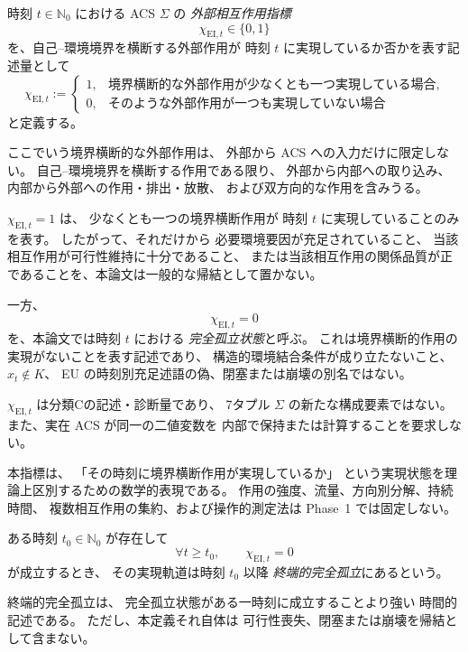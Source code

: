 \begin{definition}
\label{def:phi}
時刻 $t\in\mathbb{N}_0$ における ACS $\Sigma$ の
\emph{外部相互作用指標}
\[
  \chi_{\mathrm{EI},t}\in\{0,1\}
\]
を、自己--環境境界を横断する外部作用が
時刻 $t$ に実現しているか否かを表す記述量として
\[
  \chi_{\mathrm{EI},t}
  :=
  \begin{cases}
    1,
    &
    \text{境界横断的な外部作用が少なくとも一つ実現している場合},
    \\[4pt]
    0,
    &
    \text{そのような外部作用が一つも実現していない場合}
  \end{cases}
\]
と定義する。

ここでいう境界横断的な外部作用は、
外部から ACS への入力だけに限定しない。
自己--環境境界を横断する作用である限り、
外部から内部への取り込み、
内部から外部への作用・排出・放散、
および双方向的な作用を含みうる。

$\chi_{\mathrm{EI},t}=1$ は、
少なくとも一つの境界横断作用が
時刻 $t$ に実現していることのみを表す。
したがって、それだけから
必要環境要因が充足されていること、
当該相互作用が可行性維持に十分であること、
または当該相互作用の関係品質が正であることを、本論文は一般的な帰結として置かない。

一方、
\[
  \chi_{\mathrm{EI},t}=0
\]
を、本論文では時刻 $t$ における
\emph{完全孤立状態}と呼ぶ。
これは境界横断的作用の実現がないことを表す記述であり、
構造的環境結合条件が成り立たないこと、$x_t\notin K$、
EU の時刻別充足述語の偽、閉塞または崩壊の別名ではない。
\end{definition}

\begin{remark}
\label{rem:chi_ei_status}
$\chi_{\mathrm{EI},t}$ は分類Cの記述・診断量であり、
7タプル $\Sigma$ の新たな構成要素ではない。
また、実在 ACS が同一の二値変数を
内部で保持または計算することを要求しない。

本指標は、
「その時刻に境界横断作用が実現しているか」
という実現状態を理論上区別するための数学的表現である。
作用の強度、流量、方向別分解、持続時間、
複数相互作用の集約、および操作的測定法は
Phase~1 では固定しない。
\end{remark}

\begin{definition}[終端的完全孤立]
\label{def:terminal_isolation}
ある時刻 $t_0\in\mathbb{N}_0$ が存在して
\[
  \forall t\ge t_0,
  \qquad
  \chi_{\mathrm{EI},t}=0
\]
が成立するとき、
その実現軌道は時刻 $t_0$ 以降
\emph{終端的完全孤立}にあるという。

終端的完全孤立は、
完全孤立状態がある一時刻に成立することより強い
時間的記述である。
ただし、本定義それ自体は
可行性喪失、閉塞または崩壊を帰結として含まない。
\end{definition}

